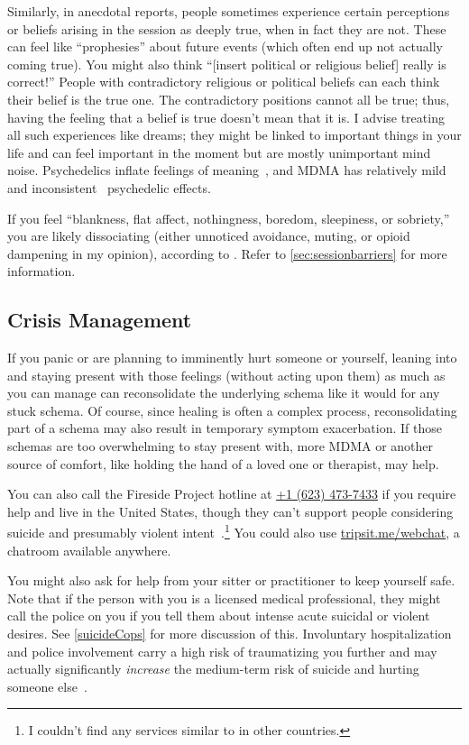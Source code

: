 \documentclass[11pt,oneside]{book}
\let\cite\parencite
\begin{document}
Similarly, in anecdotal reports, people sometimes experience certain perceptions or beliefs arising in the session as deeply true, when in fact they are not. These can feel like \enquote{prophesies} about future events (which often end up not actually coming true). You might also think \enquote{[insert political or religious belief] really is correct!} People with contradictory religious or political beliefs can each think their belief is the true one. The contradictory positions cannot all be true; thus, having the feeling that a belief is true doesn't mean that it is. I advise treating all such experiences like dreams; they might be linked to important things in your life and can feel important in the moment but are mostly unimportant mind noise. Psychedelics inflate feelings of meaning~\cite{hartogsohn2018meaning}, and MDMA has relatively mild~\cite{studerus2010psychometric} and inconsistent~\cite{effectindex} psychedelic effects.

If you feel \enquote{blankness, flat affect, nothingness, boredom, sleepiness, or sobriety,} you are likely dissociating (either unnoticed avoidance, muting, or opioid dampening in my opinion), according to \textcite[p. 14]{razviPSIP}. Refer to \cref{sec:sessionbarriers} for more information.

\subsection*{Crisis Management}
If you panic or are planning to imminently hurt someone or yourself, leaning into and staying present with those feelings (without acting upon them) as much as you can manage can reconsolidate the underlying schema like it would for any stuck schema. Of course, since healing is often a complex process, reconsolidating part of a schema may also result in temporary symptom exacerbation. If those schemas are too overwhelming to stay present with, more MDMA or another source of comfort, like holding the hand of a loved one or therapist, may help.

You can also call the Fireside Project hotline at \href{tel:1-623-473-7433}{+1 (623) 473-7433} if you require help and live in the United States, though they can't support people considering suicide and presumably violent intent~\cite{firesideProject}.\footnote{I couldn't find any services similar to \cite{firesideProject} in other countries.} You could also use \href{https://tripsit.me/webchat}{tripsit.me/webchat}, a chatroom available anywhere.

You might also ask for help from your sitter or practitioner to keep yourself safe. Note that if the person with you is a licensed medical professional, they might call the police on you if you tell them about intense acute suicidal or violent desires. See \cref{suicideCops} for more discussion of this. Involuntary hospitalization and police involvement carry a high risk of traumatizing you further and may actually significantly \textit{increase} the medium-term risk of suicide and hurting someone else~\cite{emanuelHospitalization}.
\end{document}
